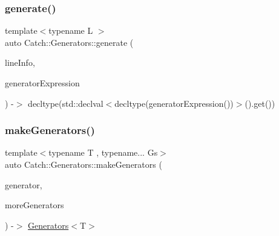 \mbox{\label{namespace_catch_1_1_generators_adbda9e2d18cd3e4dbb124c7d8830c97b}} 
\subsubsection{\texorpdfstring{generate()}{generate()}}
{\footnotesize\ttfamily template$<$typename L $>$ \\
auto Catch\+::\+Generators\+::generate (\begin{DoxyParamCaption}\item[{\mbox{\hyperlink{struct_catch_1_1_source_line_info}{Source\+Line\+Info}} const \&}]{line\+Info,  }\item[{L const \&}]{generator\+Expression }\end{DoxyParamCaption}) -\/$>$ decltype(std\+::declval$<$decltype(generator\+Expression())$>$().get()) }

\mbox{\label{namespace_catch_1_1_generators_adabbca9c7049bd8b5dd0474240108485}} 
\subsubsection{\texorpdfstring{makeGenerators()}{makeGenerators()}\hspace{0.1cm}{\footnotesize\ttfamily [1/4]}}
{\footnotesize\ttfamily template$<$typename T , typename... Gs$>$ \\
auto Catch\+::\+Generators\+::make\+Generators (\begin{DoxyParamCaption}\item[{\mbox{\hyperlink{class_catch_1_1_generators_1_1_generator_wrapper}{Generator\+Wrapper}}$<$ T $>$ \&\&}]{generator,  }\item[{Gs...}]{more\+Generators }\end{DoxyParamCaption}) -\/$>$ \mbox{\hyperlink{class_catch_1_1_generators_1_1_generators}{Generators}}$<$T$>$ }

\mbox{\label{namespace_catch_1_1_generators_abefb1a0fab3c669b98a53037b3286d22}} 
